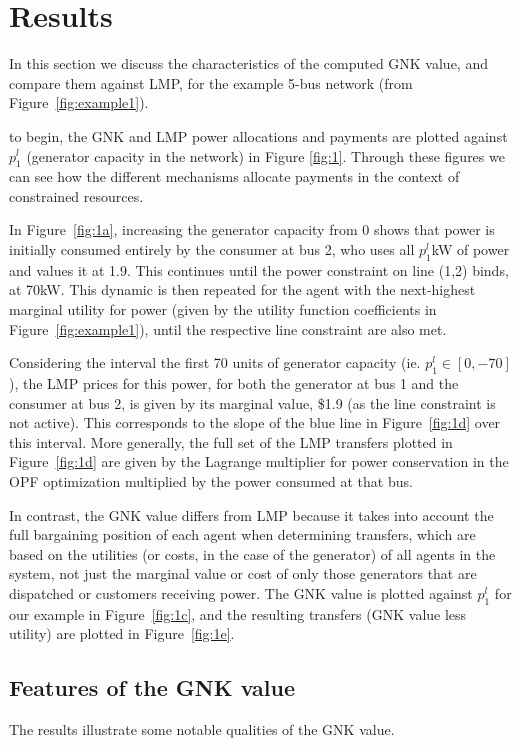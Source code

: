 \section{Results}\label{sec:features}

In this section we discuss the characteristics of the computed GNK value, and compare them against LMP, for the example 5-bus network (from Figure~\ref{fig:example1}).

to begin, the GNK and LMP power allocations and payments are plotted against $p_1^l$ (generator capacity in the network) in Figure \ref{fig:1}.
Through these figures we can see how the different mechanisms allocate payments in the context of constrained resources.

\iffigures
% 
\fi

In Figure~\ref{fig:1a}, increasing the generator capacity from $0$ shows that power is initially consumed entirely by the consumer at bus 2, 
who uses all $p_1^l$kW of power and values it at 1.9. This continues until the power constraint on line (1,2) binds, at 70kW.  
This dynamic is then repeated for the agent with the next-highest marginal utility for power (given by the utility function coefficients in Figure~\ref{fig:example1}), until the respective line constraint are also met.

Considering the interval the first 70 units of generator capacity (ie. $p_1^l \in [0,-70]$), the LMP prices for this power, for both the generator at bus 1 and the consumer at bus 2, is given by its marginal value, \$1.9 (as the line constraint is not active). This corresponds to the slope of the blue line in Figure~\ref{fig:1d} over this interval. 
More generally, the full set of the LMP transfers plotted in Figure~\ref{fig:1d} are given by the Lagrange multiplier for power conservation in the OPF optimization multiplied by the power consumed at that bus.

In contrast, the GNK value differs from LMP because it takes into account the full bargaining position of each agent when determining transfers, which are based on the utilities (or costs, in the case of the generator) of all agents in the system, 
not just the marginal value or cost of only those generators that are dispatched or customers receiving power. 
The GNK value is plotted against $p_1^l$ for our example in Figure~\ref{fig:1c}, and the resulting transfers (GNK value less utility) are plotted in Figure~\ref{fig:1e}.\\

\subsection{Features of the GNK value}
The results illustrate some notable qualities of the GNK value.

